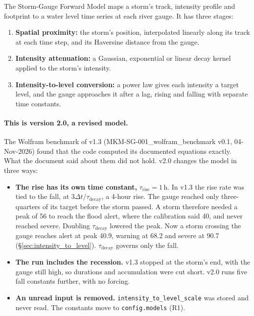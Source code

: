 \documentclass[11pt,a4paper]{article}
\newcommand{\sgStormAlert}{40.9}
\newcommand{\sgStormWarning}{68.2}
\newcommand{\sgStormSevere}{90.7}
\begin{document}
\sloppy
\mkmtitlepage
\mkmlegalpage
\tableofcontents
\clearpage

\mkmexecsummary

The Storm-Gauge Forward Model maps a storm's track, intensity profile and footprint to a
water level time series at each river gauge. It has three stages:
\begin{enumerate}[nosep]
    \item \textbf{Spatial proximity:} the storm's position, interpolated linearly along
          its track at each time step, and its Haversine distance from the gauge.
    \item \textbf{Intensity attenuation:} a Gaussian, exponential or linear decay
          kernel applied to the storm's intensity.
    \item \textbf{Intensity-to-level conversion:} a power law gives each intensity a
          target level, and the gauge approaches it after a lag, rising and falling
          with separate time constants.
\end{enumerate}

\paragraph{This is version 2.0, a revised model.} The Wolfram benchmark of v1.3
(MKM-SG-001\_wolfram\_benchmark v0.1, 04-Nov-2026) found that the code computed its
documented equations exactly. What the document said about them did not hold. v2.0
changes the model in three ways:
\begin{itemize}[nosep]
    \item \textbf{The rise has its own time constant,} $\tau_{\text{rise}}=1$\,h. In
          v1.3 the rise rate was tied to the fall, at $3\Delta t/\tau_{\text{decay}}$,
          a 4-hour rise. The gauge reached only three-quarters of its target before the
          storm passed. A storm therefore needed a peak of 56 to reach the flood alert,
          where the calibration said 40, and never reached severe. Doubling
          $\tau_{\text{decay}}$ lowered the peak. Now a storm crossing the gauge reaches
          alert at peak \sgStormAlert, warning at \sgStormWarning{} and severe at
          \sgStormSevere{} (\S\ref{sec:intensity_to_level}). $\tau_{\text{decay}}$ governs
          only the fall.
    \item \textbf{The run includes the recession.} v1.3 stopped at the storm's end,
          with the gauge still high, so durations and accumulation were cut short.
          v2.0 runs five fall constants further, with no forcing.
    \item \textbf{An unread input is removed.} \texttt{intensity\_to\_level\_scale} was
          stored and never read. The constants move to \texttt{config.models} (R1).
\end{itemize}
\end{document}
